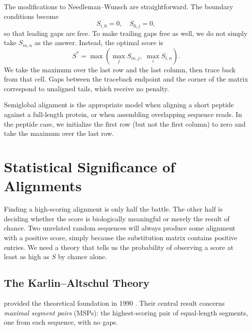 The modifications to Needleman--Wunsch are straightforward. The boundary conditions become
\begin{equation}
  \label{eq:semiglobal-boundary}
  S_{i,0} = 0, \quad S_{0,j} = 0,
\end{equation}
so that leading gaps are free. To make trailing gaps free as well, we do not simply take $S_{m,n}$ as the answer. Instead, the optimal score is
\begin{equation}
  \label{eq:semiglobal-score}
  S^* = \max\!\left(\max_{j} S_{m,j},\; \max_{i} S_{i,n}\right).
\end{equation}
We take the maximum over the last row and the last column, then trace back from that cell. Gaps between the traceback endpoint and the corner of the matrix correspond to unaligned tails, which receive no penalty.

Semiglobal alignment is the appropriate model when aligning a short peptide against a full-length protein, or when assembling overlapping sequence reads. In the peptide case, we initialize the first row (but not the first column) to zero and take the maximum over the last row.


\section{Statistical Significance of Alignments}
\label{sec:blast-statistics}

Finding a high-scoring alignment is only half the battle. The other half is deciding whether the score is biologically meaningful or merely the result of chance. Two unrelated random sequences will always produce some alignment with a positive score, simply because the substitution matrix contains positive entries. We need a theory that tells us the probability of observing a score at least as high as $S$ by chance alone.


\subsection{The Karlin--Altschul Theory}
\label{sec:karlin-altschul}

 provided the theoretical foundation in 1990 \cite{karlin1990}. Their central result concerns \emph{maximal segment pairs} (MSPs): the highest-scoring pair of equal-length segments, one from each sequence, with no gaps.

